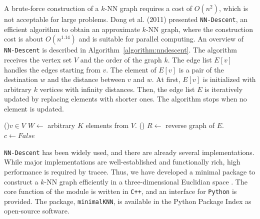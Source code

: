 A brute-force construction of a $k$-NN graph requires a cost of $O(n^{2})$, which is not acceptable for large problems. Dong et al. (2011) presented \texttt{NN-Descent}, an efficient algorithm to obtain an approximate $k$-NN graph, where the construction cost is about $O(n^{1.14})$ and is suitable for parallel computing. An overview of \texttt{NN-Descent} is described in Algorithm~\ref{algorithm:nndescent}. The algorithm receives the vertex set $V$ and the order of the graph $k$. The edge list $E[v]$ handles the edges starting from $v$. The element of $E[v]$ is a pair of the destination $w$ and the distance between $v$ and $w$. At first, $E[v]$ is initialized with arbitrary $k$ vertices with infinity distances. Then, the edge list $E$ is iteratively updated by replacing elements with shorter ones. The algorithm stops when no element is updated.

\begin{algorithm}[t]
  \caption{\texttt{NN-Descent}}
  \label{algorithm:nndescent}
  \DontPrintSemicolon
  \BlankLine
  \ForEach(){$v \in V$}{
    {$W \gets$ arbitrary $K$ elements from $V$.}\;
  }
  \Loop(){}{
    {$R \gets$ reverse graph of $E$.}\;
    {$c \gets \mathit{False}$}\;
  }
\end{algorithm}

\texttt{NN-Descent} has been widely used, and there are already several implementations. While major implementations are well-established and functionally rich, high performance is required by tracee. Thus, we have developed a minimal package to construct a $k$-NN graph efficiently in a three-dimensional Euclidian space \citep{ohsawa_minimalknn_2020}. The core function of the module is written in \texttt{C++}, and an interface for \texttt{Python} is provided. The package, \texttt{minimalKNN}, is available in the Python Package Index as open-source software.


